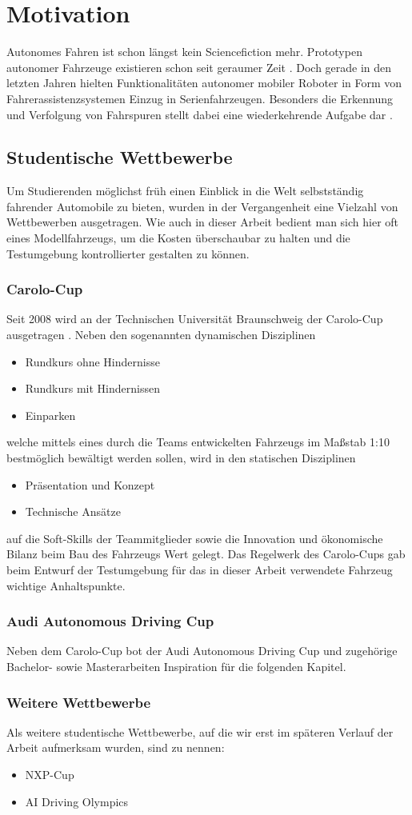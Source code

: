 \section{Motivation}
Autonomes Fahren ist schon längst kein Sciencefiction mehr. Prototypen autonomer Fahrzeuge existieren schon seit geraumer Zeit \autocite{AutonomesFahrenSeit}. Doch gerade in den letzten Jahren hielten Funktionalitäten autonomer mobiler Roboter in Form von Fahrerassistenzsystemen Einzug in Serienfahrzeugen. Besonders die Erkennung und Verfolgung von Fahrspuren stellt dabei eine wiederkehrende Aufgabe dar \autocite{kunzeReadingLanesRoad, naroteReviewRecentAdvances2018, guldeSpurhalteassistentenImTest2014}.
\subsection{Studentische Wettbewerbe}
Um Studierenden möglichst früh einen Einblick in die Welt selbstständig fahrender Automobile zu bieten, wurden in der Vergangenheit eine Vielzahl von Wettbewerben ausgetragen. Wie auch in dieser Arbeit bedient man sich hier oft eines Modellfahrzeugs, um die Kosten überschaubar zu halten und die Testumgebung kontrollierter gestalten zu können.
\subsubsection{Carolo-Cup}
Seit 2008 wird an der Technischen Universität Braunschweig der Carolo-Cup ausgetragen \autocite{CaroloCupCaroloCup}. Neben den sogenannten dynamischen Disziplinen
\begin{itemize}
\item Rundkurs ohne Hindernisse
\item Rundkurs mit Hindernissen
\item Einparken
\end{itemize}
welche mittels eines durch die Teams entwickelten Fahrzeugs im Maßstab 1:10 bestmöglich bewältigt werden sollen, wird in den statischen Disziplinen
\begin{itemize}
\item Präsentation und Konzept
\item Technische Ansätze
\end{itemize}
auf die Soft-Skills der Teammitglieder sowie die Innovation und ökonomische Bilanz beim Bau des Fahrzeugs Wert gelegt. Das Regelwerk des Carolo-Cups \autocite{CaroloCupRegulations2019} gab beim Entwurf der Testumgebung für das in dieser Arbeit verwendete Fahrzeug wichtige Anhaltspunkte.
\subsubsection{Audi Autonomous Driving Cup}
Neben dem Carolo-Cup bot der Audi Autonomous Driving Cup \cite{AudiAutonomousDriving} und zugehörige Bachelor- sowie Masterarbeiten Inspiration für die folgenden Kapitel.
\subsubsection{Weitere Wettbewerbe}
Als weitere studentische Wettbewerbe, auf die wir erst im späteren Verlauf der Arbeit aufmerksam wurden, sind zu nennen:
\begin{itemize}
\item NXP-Cup \autocite{NXPCupEMEA}
\item AI Driving Olympics \autocite{AIDOAIDriving}
\end{itemize}



